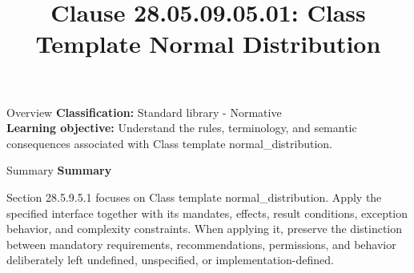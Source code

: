 \documentclass[10pt,letterpaper]{article}
\title{Clause 28.05.09.05.01: Class Template Normal Distribution}
\author{}
\date{}
\begin{document}
\maketitle
\begin{CornellOverviewBox}{Overview}
\textbf{Classification:} Standard library - Normative\\[2pt]
\textbf{Learning objective:} Understand the rules, terminology, and semantic consequences associated with Class template normal\_distribution.
\end{CornellOverviewBox}\begin{CornellSummaryBox}{Summary}
{\sffamily\bfseries\color{Accent} Summary}\par\vspace{3pt}Section 28.5.9.5.1 focuses on Class template normal\_distribution. Apply the specified interface together with its mandates, effects, result conditions, exception behavior, and complexity constraints. When applying it, preserve the distinction between mandatory requirements, recommendations, permissions, and behavior deliberately left undefined, unspecified, or implementation-defined.
\end{CornellSummaryBox}
\end{document}
